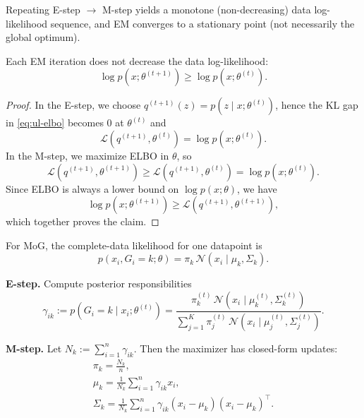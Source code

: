 \documentclass[../main]{subfiles}
\begin{document}
\begin{remark}
    Repeating E-step $\rightarrow$ M-step yields a monotone (non-decreasing)
    data log-likelihood sequence, and EM converges to a stationary point (not
    necessarily the global optimum).
\end{remark}

\begin{proposition}
    Each EM iteration does not decrease the data log-likelihood:
    \[
        \log p(x;\theta^{(t+1)}) \ge \log p(x;\theta^{(t)}).
    \]
\end{proposition}
\begin{proof}
    In the E-step, we choose $q^{(t+1)}(z)=p(z\mid x;\theta^{(t)})$, hence the KL
    gap in \eqref{eq:ul-elbo} becomes $0$ at $\theta^{(t)}$ and
    \[
        \mathcal L(q^{(t+1)},\theta^{(t)})=\log p(x;\theta^{(t)}).
    \]
    In the M-step, we maximize ELBO in $\theta$, so
    \[
        \mathcal L(q^{(t+1)},\theta^{(t+1)})
        \ge
        \mathcal L(q^{(t+1)},\theta^{(t)})
        =
        \log p(x;\theta^{(t)}).
    \]
    Since ELBO is always a lower bound on $\log p(x;\theta)$, we have
    \[
        \log p(x;\theta^{(t+1)}) \ge \mathcal L(q^{(t+1)},\theta^{(t+1)}),
    \]
    which together proves the claim.
\end{proof}


For MoG, the complete-data likelihood for one datapoint is
\begin{equation}
    p(x_i,G_i=k;\theta)
    = \pi_k\,\mathcal N(x_i\mid \mu_k,\Sigma_k).
\end{equation}

\textbf{E-step.} Compute posterior responsibilities
\begin{equation}
    \gamma_{ik}
    :=
    p(G_i=k\mid x_i;\theta^{(t)})
    =
    \frac{\pi_k^{(t)}\, \mathcal{N}(x_i \mid \mu_k^{(t)}, \Sigma_k^{(t)})}
         {\sum_{j=1}^{K} \pi_j^{(t)}\, \mathcal{N}(x_i \mid \mu_j^{(t)}, \Sigma_j^{(t)})}.
\end{equation}

\textbf{M-step.} Let $N_k:=\sum_{i=1}^n\gamma_{ik}$. Then the maximizer has
closed-form updates:
\begin{gather}
    \pi_k=\frac{N_k}{n},\\
    \mu_k=\frac{1}{N_k}\sum_{i=1}^n \gamma_{ik}x_i,\\
    \Sigma_k=\frac{1}{N_k}\sum_{i=1}^n \gamma_{ik}(x_i-\mu_k)(x_i-\mu_k)^{\top}.
\end{gather}
\end{document}
